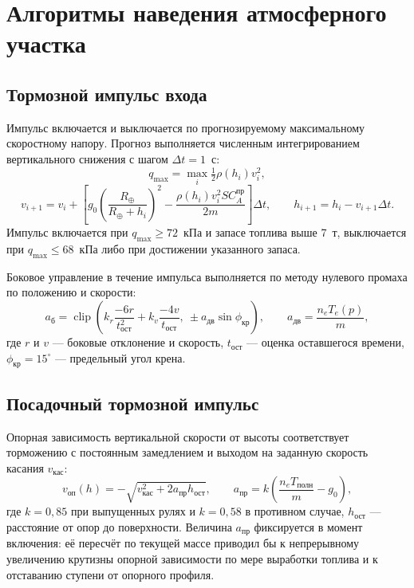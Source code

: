 \documentclass[11pt,a4paper]{article}
\begin{document}
\section{Алгоритмы наведения атмосферного участка}

\subsection{Тормозной импульс входа}
\label{subsec:entry}

Импульс включается и выключается по прогнозируемому максимальному скоростному
напору. Прогноз выполняется численным интегрированием вертикального снижения с
шагом $\Delta t=1$~с:
\begin{equation}
q_{\max} = \max_i \tfrac12\rho(h_i)v_i^2,
\end{equation}
\begin{equation}
v_{i+1}=v_i+\left[g_0\left(\frac{R_\oplus}{R_\oplus+h_i}\right)^2
 - \frac{\rho(h_i) v_i^2 S C_A^{\text{пр}}}{2m}\right]\Delta t,
\qquad
h_{i+1}=h_i-v_{i+1}\Delta t .
\end{equation}
Импульс включается при $q_{\max}\ge72$~кПа и запасе топлива выше 7~т,
выключается при $q_{\max}\le68$~кПа либо при достижении указанного запаса.

Боковое управление в течение импульса выполняется по методу нулевого промаха по
положению и скорости:
\begin{equation}
a_{\text{б}} = \operatorname{clip}\!\left(
 k_r\frac{-6 r}{t_{\text{ост}}^2} + k_v\frac{-4 v}{t_{\text{ост}}},
 \ \pm a_{\text{дв}}\sin\phi_{\text{кр}}\right),
\qquad
a_{\text{дв}} = \frac{n_e T_e(p)}{m},
\end{equation}
где $r$ и $v$ — боковые отклонение и скорость, $t_{\text{ост}}$ — оценка
оставшегося времени, $\phi_{\text{кр}}=15^\circ$ — предельный угол крена.

\subsection{Посадочный тормозной импульс}

Опорная зависимость вертикальной скорости от высоты соответствует торможению с
постоянным замедлением и выходом на заданную скорость касания $v_{\text{кас}}$:
\begin{equation}
v_{\text{оп}}(h) = -\sqrt{v_{\text{кас}}^2
 + 2 a_{\text{пр}} h_{\text{ост}}},
\qquad
a_{\text{пр}} = k\left(\frac{n_e T_{\text{полн}}}{m}-g_0\right),
\end{equation}
где $k=0{,}85$ при выпущенных рулях и $k=0{,}58$ в противном случае,
$h_{\text{ост}}$ — расстояние от опор до поверхности. Величина $a_{\text{пр}}$
фиксируется в момент включения: её пересчёт по текущей массе приводил бы к
непрерывному увеличению крутизны опорной зависимости по мере выработки топлива и
к отставанию ступени от опорного профиля.
\end{document}
